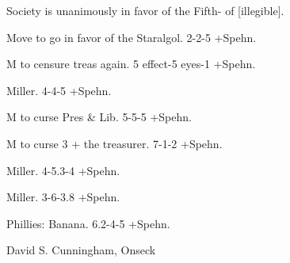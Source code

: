\documentclass[12pt]{article}
\begin{document}
Society is unanimously in favor of the Fifth- of [illegible].

Move to go in favor of the Staralgol. 2-2-5 +Spehn.

M to censure treas again. 5 effect-5 eyes-1 +Spehn.

Miller. 4-4-5 +Spehn.

M to curse Pres & Lib. 5-5-5 +Spehn.

M to curse 3 + the treasurer. 7-1-2 +Spehn.

Miller. 4-5.3-4 +Spehn.

Miller. 3-6-3.8 +Spehn.

Phillies: Banana. 6.2-4-5 +Spehn.

\vspace{12pt}

\centerline{David S. Cunningham, Onseck}
\end{document}
